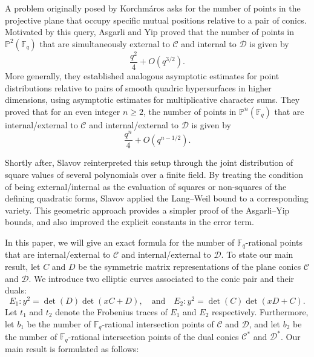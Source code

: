 \documentclass[11pt]{article}
\theoremstyle{definition}
\theoremstyle{definition}
\begin{document}
A problem originally posed by Korchmáros \cite[Problem 6.2]{Korchmros} asks for the number of points in the projective plane that occupy specific mutual positions relative to a pair of conics. Motivated by this query, Asgarli and Yip \cite[Theorem 1.2]{Asgarli} proved that the number of points in $\mathbb{P}^2(\mathbb{F}_q)$ that are simultaneously external to $\mathcal{C}$ and internal to $\mathcal{D}$ is given by 
\[
\frac{q^2}{4} + O\left(q^{3/2}\right).
\]
More generally, they established analogous asymptotic estimates for point distributions relative to pairs of smooth quadric hypersurfaces in higher dimensions, using asymptotic estimates for multiplicative character sums. They \cite[Theorem 1.3]{Asgarli} proved that for an even integer $n\geq 2$, the number of points in $\mathbb{P}^{n}(\mathbb{F}_q)$ that are internal/external to $\mathcal{C}$ and internal/external to $\mathcal{D}$ is given by
\[
\frac{q^{n}}{4} + O\left(q^{n-1/2}\right).
\]

Shortly after, Slavov \cite{Slavov} reinterpreted this setup through the joint distribution of square values of several polynomials over a finite field. By treating the condition of being external/internal as the evaluation of squares or non-squares of the defining quadratic forms, Slavov applied the Lang–Weil bound to a corresponding variety. This geometric approach provides a simpler proof of the Asgarli–Yip bounds, and also improved the explicit constants in the error term.

In this paper, we will give an exact formula for the number of $\mathbb{F}_q$-rational points that are internal/external to $\mathcal{C}$ and internal/external to $\mathcal{D}$. To state our main result, let $C$ and $D$ be the symmetric matrix representations of the plane conics $\mathcal{C}$ and $\mathcal{D}$. We introduce two elliptic curves associated to the conic pair and their duals:
\[
E_1: y^2 = \det(D)\det(xC + D), \quad \text{and} \quad E_2: y^2 = \det(C)\det(xD + C).
\]
Let $t_1$ and $t_2$ denote the Frobenius traces of $E_1$ and $E_2$ respectively. Furthermore, let $b_1$ be the number of $\mathbb{F}_q$-rational intersection points of $\mathcal{C}$ and $\mathcal{D}$, and let $b_2$ be the number of $\mathbb{F}_q$-rational intersection points of the dual conics $\mathcal{C}^*$ and $\mathcal{D}^*$. Our main result is formulated as follows:
\end{document}
